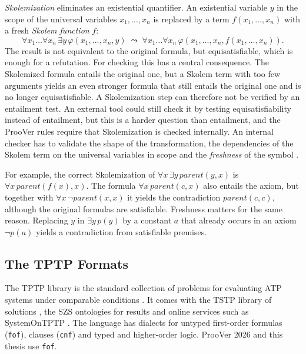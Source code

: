 \emph{Skolemization} eliminates an existential quantifier.
An existential variable $y$ in the scope of the universal variables $x_1,\dots,x_n$ is replaced by a term $f(x_1,\dots,x_n)$ with a fresh \emph{Skolem function} $f$:
\begin{equation}
  \forall x_1 \dots \forall x_n\, \exists y\, \varphi(x_1,\dots,x_n,y)
  \;\leadsto\;
  \forall x_1 \dots \forall x_n\, \varphi(x_1,\dots,x_n,f(x_1,\dots,x_n)).
  \label{eq:skolemization}
\end{equation}
The result is not equivalent to the original formula, but equisatisfiable, which is enough for a refutation.
For checking this has a central consequence.
The Skolemized formula entails the original one, but a Skolem term with too few arguments yields an even stronger formula that still entails the original one and is no longer equisatisfiable.
A Skolemization step can therefore not be verified by an entailment test. An external tool could still check it by testing equisatisfiability instead of entailment, but this is a harder question than entailment, and the ProoVer rules require that Skolemization is checked internally. An internal checker has to validate the shape of the transformation, the dependencies of the Skolem term on the universal variables in scope and the \emph{freshness} of the symbol \citep{NonnengartWeidenbach2001}.

For example, the correct Skolemization of $\forall x\,\exists y\,\mathit{parent}(y,x)$ is $\forall x\,\mathit{parent}(f(x),x)$.
The formula $\forall x\,\mathit{parent}(c,x)$ also entails the axiom, but together with $\forall x\,\neg\mathit{parent}(x,x)$ it yields the contradiction $\mathit{parent}(c,c)$, although the original formulas are satisfiable.
Freshness matters for the same reason. Replacing $y$ in $\exists y\,p(y)$ by a constant $a$ that already occurs in an axiom $\neg p(a)$ yields a contradiction from satisfiable premises.

\subsection{The TPTP Formats}
\label{subsec:tptp-tstp}

The TPTP library is the standard collection of problems for evaluating ATP systems under comparable conditions \citep{Sutcliffe2017}.
It comes with the TSTP library of solutions \citep{TSTPLibrary}, the SZS ontologies for results and online services such as SystemOnTPTP \citep{Sutcliffe2000SOTPTP}.
The language has dialects for untyped first-order formulas (\texttt{fof}), clauses (\texttt{cnf}) and typed and higher-order logic. ProoVer 2026 and this thesis use \texttt{fof}.

